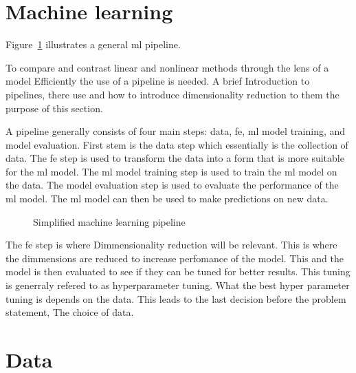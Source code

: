 \section{Machine learning}\label{sec:machine-learning}
Figure~\ref{fig:basic-machine-learning-pipeline} illustrates a general \gls{ml} pipeline.

To compare and contrast linear and nonlinear methods through the lens of a model Efficiently the use of a pipeline is needed. A brief Introduction to pipelines, there use and how to introduce dimensionality reduction to them the purpose of this section.

A pipeline generally consists of four main steps: data, \gls{fe}, \gls{ml} model training, and model evaluation. First stem is the data step which essentially is the collection of data. The \gls{fe} step is used to transform the data into a form that is more suitable for the \gls{ml} model. The \gls{ml} model training step is used to train the \gls{ml} model on the data. The model evaluation step is used to evaluate the performance of the \gls{ml} model. The \gls{ml} model can then be used to make predictions on new data. 


\begin{figure}[htb!]
    \centering
    \caption{Simplified machine learning pipeline}
    \label{fig:basic-machine-learning-pipeline}
\end{figure}

The \gls{fe} step is where Dimmensionality reduction will be relevant. This is where the dimmensions are reduced to increase perfomance of the model. This and the model is then evaluated to see if they can be tuned for better results. This tuning is generraly refered to as hyperparameter tuning. What the best hyper parameter tuning is depends on the data. This leads to the last decision before the problem statement, The choice of data.

\section*{Data}